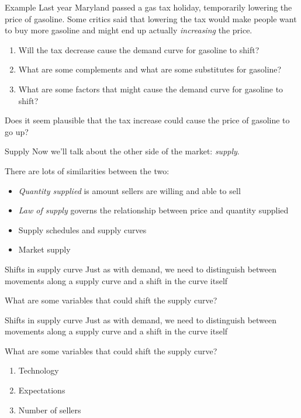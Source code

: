 \documentclass[aspectratio=169]{beamer}
\begin{document}
\begin{frame}{Example}
    Last year Maryland passed a gas tax holiday, temporarily lowering the price of gasoline. Some critics said that lowering the tax would make people want to buy more gasoline and might end up actually \textit{increasing} the price.

    \begin{enumerate}
        \item Will the tax decrease cause the demand curve for gasoline to shift?
        \item What are some complements and what are some substitutes for gasoline?
        \item What are some factors that might cause the demand curve for gasoline to shift?
    \end{enumerate}

    Does it seem plausible that the tax increase could cause the price of gasoline to go up?

  \end{frame}

  \begin{frame}{Supply}
    Now we'll talk about the other side of the market: \textit{supply}.

    \medskip

    There are lots of similarities between the two:
    \begin{itemize}
        \item \textit{Quantity supplied} is amount sellers are willing and able to sell
        \item \textit{Law of supply} governs the relationship between price and quantity supplied
        \item Supply schedules and supply curves
        \item Market supply
    \end{itemize}
\end{frame}

\begin{frame}{Shifts in supply curve}
   Just as with demand, we need to distinguish between movements along a supply curve and a shift in the curve itself

   \medskip

   What are some variables that could shift the supply curve?
\end{frame}

\begin{frame}{Shifts in supply curve}
    Just as with demand, we need to distinguish between movements along a supply curve and a shift in the curve itself

   \medskip
   
   What are some variables that could shift the supply curve?
    
    \begin{enumerate}
        \item Technology
        \item Expectations
        \item Number of sellers
    \end{enumerate}
 \end{frame}
\end{document}
